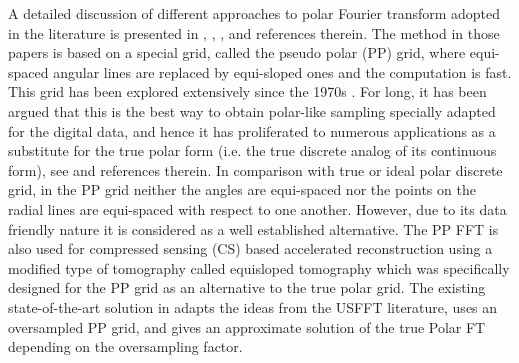 \documentclass{UCF_ETD}
\begin{document}
 A detailed discussion of different approaches to polar Fourier transform adopted in the literature is presented in \cite{Amir2001}, \cite{Amir2006}, \cite{Amir2008}, \cite{Amir_II_2008} and references therein. The method in those papers is based on a special grid, called the pseudo polar (PP) grid, where equi-spaced angular lines are replaced by equi-sloped ones and the computation is fast. %
 This grid has been explored extensively since the 1970s \cite{Amir2006}. For long, it has been argued that this is the best way to obtain polar-like sampling  specially adapted for the digital data, and hence it has proliferated to numerous applications as a substitute for the true polar form  (i.e. the true discrete analog of its continuous form), see \cite{Amir2008} and references therein. In comparison with true or ideal polar discrete grid, in the PP grid neither the angles are equi-spaced nor the points on the radial lines are equi-spaced with respect to one another. However, due to its data friendly nature it is considered as a well established alternative. The PP FFT is also used for compressed sensing (CS) based accelerated reconstruction \cite{Hashemia2015} using a modified type of tomography called equisloped tomography \cite{Miao2005} which was specifically designed for the PP grid as an alternative to the true polar grid. The existing state-of-the-art solution in \cite{Amir2006} adapts the ideas from the USFFT literature, uses an oversampled PP grid, and gives an approximate solution of the true Polar FT depending on the oversampling factor.
 
\end{document}
